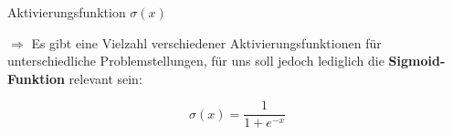 \begin{frame}{Aktivierungsfunktion \(\sigma(x)\)}
  \begin{minipage}{.45\textwidth}
    \(\Rightarrow\) Es gibt eine Vielzahl verschiedener Aktivierungsfunktionen für unterschiedliche Problemstellungen, für uns soll jedoch lediglich die \textbf{Sigmoid-Funktion} relevant sein:

    \vspace{1cm}

    \[\sigma(x) = \frac{1}{1 + e^{-x}}\]
  \end{minipage}\hfill%
  \begin{minipage}{.5\textwidth}
  \end{minipage}

\end{frame}

